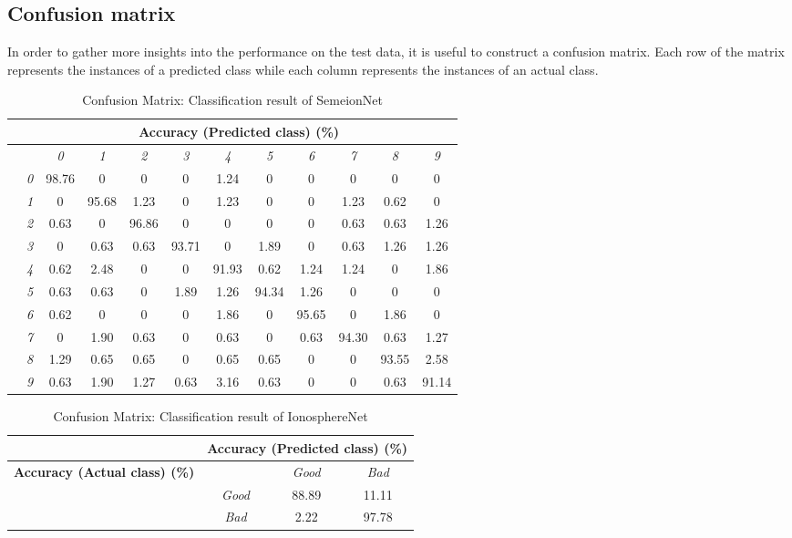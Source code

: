 \documentclass[a4paper, 11pt, twoside, openright]{article}
\begin{document}
\subsection{Confusion matrix}
In order to gather more insights into the performance on the test data, it is useful to construct a confusion matrix. Each row of the matrix represents the instances of a predicted class while each column represents the instances of an actual class.
\begin{table}[h!]
	\centering
	\begin{tabular}{| c | l | c | c | c | c | c | c | c | c | c | c | }
		 \hline
		  & \multicolumn{11}{c|}{\textbf{Accuracy (Predicted class) (\%)}} \\
		 \hline
		 \multirow{11}{*}{\rotatebox[origin=c]{90}{\textbf{Accuracy (Actual class) (\%)}}}
		 &  & \textit{0} & \textit{1} & \textit{2} & \textit{3} & \textit{4} & \textit{5} & \textit{6} & \textit{7} & \textit{8} & \textit{9} \\
		 \cline{2-12}
		 & \textit{0} & 98.76 & 0 & 0 & 0 & 1.24 & 0 & 0 & 0 & 0 & 0 \\
		 \cline{2-12}
		 & \textit{1} & 0 & 95.68 & 1.23 & 0 & 1.23 & 0 & 0 & 1.23 & 0.62 & 0 \\
		 \cline{2-12}
		 & \textit{2} & 0.63 & 0 & 96.86 & 0 & 0 & 0 & 0 & 0.63 & 0.63 & 1.26 \\
		 \cline{2-12}
		 & \textit{3} & 0 & 0.63 & 0.63 & 93.71 & 0 & 1.89 & 0 & 0.63 & 1.26 & 1.26 \\
		 \cline{2-12}
		 & \textit{4} & 0.62 & 2.48 & 0 & 0 & 91.93 & 0.62 & 1.24 & 1.24 & 0 & 1.86 \\
		 \cline{2-12}
		 & \textit{5} & 0.63 & 0.63 & 0 & 1.89 & 1.26 & 94.34 & 1.26 & 0 & 0 & 0 \\
		 \cline{2-12}
		 & \textit{6} & 0.62 & 0 & 0 & 0 & 1.86 & 0 & 95.65 & 0 & 1.86 & 0 \\
		 \cline{2-12}
		 & \textit{7} & 0 & 1.90 & 0.63 & 0 & 0.63 & 0 & 0.63 & 94.30 & 0.63 & 1.27 \\
		 \cline{2-12}
		 & \textit{8} & 1.29 & 0.65 & 0.65 & 0 & 0.65 & 0.65 & 0 & 0 & 93.55 & 2.58 \\
		 \cline{2-12}
		 & \textit{9} & 0.63 & 1.90 & 1.27 & 0.63 & 3.16 & 0.63 & 0 & 0 & 0.63 & 91.14 \\
		 \hline
	\end{tabular}
	\caption{Confusion Matrix: Classification result of SemeionNet}
\end{table}


\begin{table}[h!]
	\centering
	\begin{tabular}{ | l | c | c | c |}
		 \hline
		  & \multicolumn{3}{c|}{\textbf{Accuracy (Predicted class) (\%)}} \\
		 \hline
		 \multirow{2}{*}{\textbf{Accuracy (Actual class) (\%)}} & & \textit{Good} & \textit{Bad}\\
		 \cline{2-4}
		 & \textit{Good} & 88.89 & 11.11 \\
		 \cline{2-4}
		 & \textit{Bad} & 2.22 & 97.78 \\
		 \hline
	\end{tabular}
	\caption{Confusion Matrix: Classification result of IonosphereNet}
\end{table}
\end{document}
